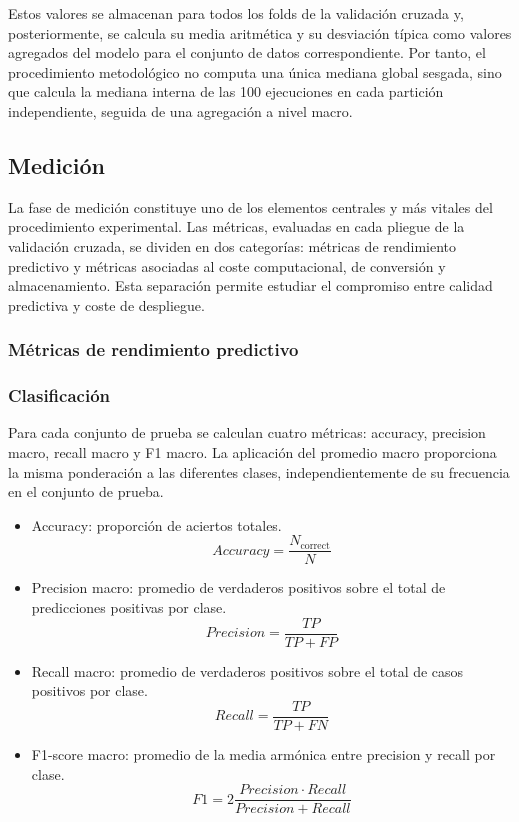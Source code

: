 \documentclass[a4paper,12pt,twoside,final]{book}
\begin{document}
Estos valores se almacenan para todos los folds de la validación cruzada y, posteriormente, se calcula su
media aritmética y su desviación típica como valores agregados del modelo para el conjunto de datos correspondiente.
Por tanto, el procedimiento metodológico no computa una única mediana global sesgada, sino que calcula la mediana
interna de las 100 ejecuciones en cada partición independiente, seguida de una agregación a nivel macro.

\subsection{Medición}
La fase de medición constituye uno de los elementos centrales y más vitales del procedimiento experimental. Las
métricas, evaluadas en cada pliegue de la validación cruzada, se dividen en dos categorías: métricas de rendimiento
predictivo y métricas asociadas al coste computacional, de conversión y almacenamiento. Esta separación permite
estudiar el compromiso entre calidad predictiva y coste de despliegue.

\subsubsection{Métricas de rendimiento predictivo}
\subsubsection{Clasificación}
Para cada conjunto de prueba se calculan cuatro métricas: accuracy, precision macro, recall macro y F1 macro. La
aplicación del promedio macro proporciona la misma ponderación a las diferentes clases, independientemente de su
frecuencia en el conjunto de prueba.\\

\begin{itemize}
  \item Accuracy: proporción de aciertos totales.
  \[
  Accuracy = \frac{N_{\mathrm{correct}}}{N}
  \]

  \item Precision macro: promedio de verdaderos positivos sobre el total de predicciones positivas por clase.
  \[
  Precision = \frac{TP}{TP+FP}
  \]

  \item Recall macro: promedio de verdaderos positivos sobre el total de casos positivos por clase.
  \[
  Recall = \frac{TP}{TP+FN}
  \]

  \item F1-score macro: promedio de la media armónica entre precision y recall por clase.
  \[
  F1 = 2 \frac{Precision \cdot Recall}{Precision+Recall}
  \]
\end{itemize}
\end{document}
